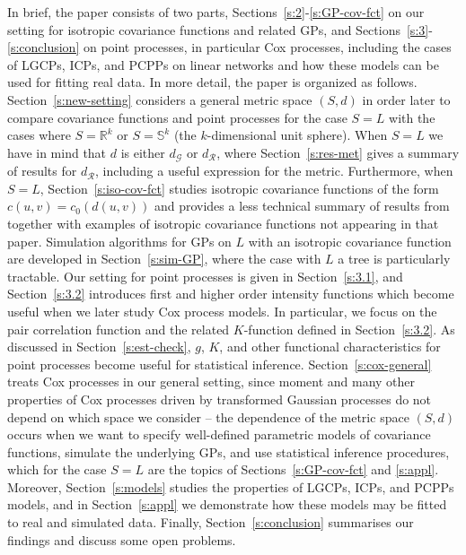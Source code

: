 \documentclass[alpha-refs]{wiley-article}
\begin{document}
In brief, the paper consists of two parts, Sections~\ref{s:2}-\ref{s:GP-cov-fct} on our setting for isotropic covariance functions and related GPs, 
and Sections~\ref{s:3}-\ref{s:conclusion} on point processes, in particular Cox processes, including the cases of LGCPs, ICPs, and PCPPs on linear networks and how these models can be used for fitting real data. 
In more detail, the paper is organized as follows. Section~\ref{s:new-setting} considers a general metric space $(S,d)$ in order later to compare covariance functions and point processes for the case $S=L$ with the cases where $S=\mathbb R^k$ or $S=\mathbb S^k$ (the $k$-dimensional unit sphere). When $S=L$ we have in mind that $d$ is either $d_{\mathcal G}$ or $d_{\mathcal R}$, where Section~\ref{s:res-met} gives a summary of results for $d_{\mathcal R}$, including a useful expression for the metric. 
Furthermore, when $S=L$, Section~\ref{s:iso-cov-fct} studies isotropic covariance functions of the form $c(u,v)=c_0(d(u,v))$ and provides a less technical summary of results from \citet{AnderesEtAl} together with examples of isotropic covariance functions not appearing in that paper. %
Simulation algorithms for GPs on $L$ with an isotropic covariance function are developed in Section~\ref{s:sim-GP}, where the case with $L$ a tree is particularly tractable. Our setting for point processes is given in Section~\ref{s:3.1}, and Section~\ref{s:3.2} introduces first and higher order intensity functions which become useful when we later study Cox process models. In particular, we focus on the pair correlation function and
the related $K$-function defined in Section~\ref{s:3.2}. As discussed in Section~\ref{s:est-check},  $g$, $K$, and other functional characteristics for point processes become useful for statistical inference. Section~\ref{s:cox-general} treats Cox processes in our general setting, since moment and many other properties of Cox processes driven by transformed Gaussian processes do not depend on which space we consider -- 
the dependence of the metric space $(S,d)$ occurs when we want to specify well-defined parametric models of covariance functions, simulate the underlying GPs, and use statistical inference procedures, which for the case $S=L$ are the topics of Sections~\ref{s:GP-cov-fct} and \ref{s:appl}. Moreover, Section~\ref{s:models} studies the properties of LGCPs, ICPs, and PCPPs models, and in Section~\ref{s:appl} we demonstrate how these models may be fitted to real and simulated data. Finally, Section~\ref{s:conclusion} summarises our findings and discuss some open problems. 
\end{document}
